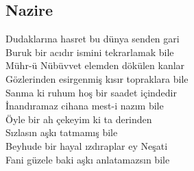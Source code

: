 \subsection{Nazire}

Dudaklarına hasret bu dünya senden gari \\
Buruk bir acıdır ismini tekrarlamak bile \\

\noindent\newline
Mühr-ü Nübüvvet elemden dökülen kanlar \\
Gözlerinden esirgenmiş kısır topraklara bile \\

\noindent\newline
Sanma ki ruhum hoş bir saadet içindedir \\
İnandıramaz cihana mest-i nazım bile \\

\noindent\newline
Öyle bir ah çekeyim ki ta derinden \\
Sızlasın aşkı tatmamış bile \\

\noindent\newline
Beyhude bir hayal ızdıraplar ey Neşati \\
Fani güzele baki aşkı anlatamazsın bile \\